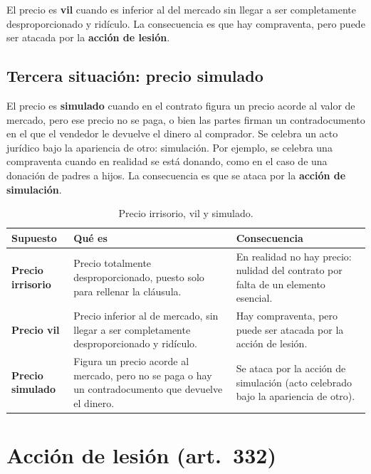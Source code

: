 \documentclass[12pt,oneside]{book}
\begin{document}
El precio es \textbf{vil} cuando es inferior al del mercado sin llegar a ser completamente desproporcionado y rid\'iculo. La consecuencia es que hay compraventa, pero puede ser atacada por la \textbf{acci\'on de lesi\'on}.

\subsection{Tercera situaci\'on: precio simulado}

El precio es \textbf{simulado} cuando en el contrato figura un precio acorde al valor de mercado, pero ese precio no se paga, o bien las partes firman un contradocumento en el que el vendedor le devuelve el dinero al comprador. Se celebra un acto jur\'idico bajo la apariencia de otro: simulaci\'on. Por ejemplo, se celebra una compraventa cuando en realidad se est\'a donando, como en el caso de una donaci\'on de padres a hijos. La consecuencia es que se ataca por la \textbf{acci\'on de simulaci\'on}.

\begin{table}[H]
\centering
\renewcommand{\arraystretch}{1.3}
\begin{tabularx}{\linewidth}{@{}>{\raggedright\arraybackslash}p{2.6cm}>{\raggedright\arraybackslash}X>{\raggedright\arraybackslash}X@{}}
\toprule
\textbf{Supuesto} & \textbf{Qu\'e es} & \textbf{Consecuencia} \\
\midrule
\textbf{Precio irrisorio} & Precio totalmente desproporcionado, puesto solo para rellenar la cl\'ausula. & En realidad no hay precio: nulidad del contrato por falta de un elemento esencial. \\
\textbf{Precio vil} & Precio inferior al de mercado, sin llegar a ser completamente desproporcionado y rid\'iculo. & Hay compraventa, pero puede ser atacada por la acci\'on de lesi\'on. \\
\textbf{Precio simulado} & Figura un precio acorde al mercado, pero no se paga o hay un contradocumento que devuelve el dinero. & Se ataca por la acci\'on de simulaci\'on (acto celebrado bajo la apariencia de otro). \\
\bottomrule
\end{tabularx}
\caption*{Precio irrisorio, vil y simulado.}
\end{table}

\section{Acci\'on de lesi\'on (art.~332)}
\end{document}
